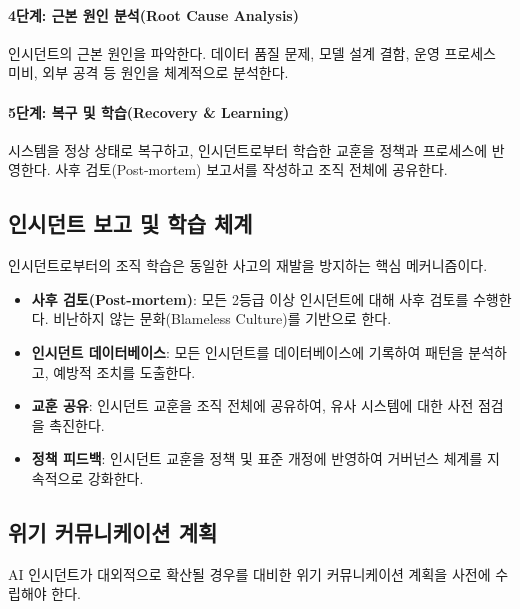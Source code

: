 \paragraph{4단계: 근본 원인 분석(Root Cause Analysis)}
인시던트의 근본 원인을 파악한다. 데이터 품질 문제, 모델 설계 결함, 운영 프로세스 미비, 외부 공격 등 원인을 체계적으로 분석한다.

\paragraph{5단계: 복구 및 학습(Recovery \& Learning)}
시스템을 정상 상태로 복구하고, 인시던트로부터 학습한 교훈을 정책과 프로세스에 반영한다. 사후 검토(Post-mortem) 보고서를 작성하고 조직 전체에 공유한다.

\subsection{인시던트 보고 및 학습 체계}
\label{sec:5.6.3}

인시던트로부터의 조직 학습은 동일한 사고의 재발을 방지하는 핵심 메커니즘이다.

\begin{itemize}
 \item \textbf{사후 검토(Post-mortem)}: 모든 2등급 이상 인시던트에 대해 사후 검토를 수행한다. 비난하지 않는 문화(Blameless Culture)를 기반으로 한다.
 \item \textbf{인시던트 데이터베이스}: 모든 인시던트를 데이터베이스에 기록하여 패턴을 분석하고, 예방적 조치를 도출한다.
 \item \textbf{교훈 공유}: 인시던트 교훈을 조직 전체에 공유하여, 유사 시스템에 대한 사전 점검을 촉진한다.
 \item \textbf{정책 피드백}: 인시던트 교훈을 정책 및 표준 개정에 반영하여 거버넌스 체계를 지속적으로 강화한다.
\end{itemize}

\subsection{위기 커뮤니케이션 계획}
\label{sec:5.6.4}

AI 인시던트가 대외적으로 확산될 경우를 대비한 위기 커뮤니케이션 계획을 사전에 수립해야 한다.

